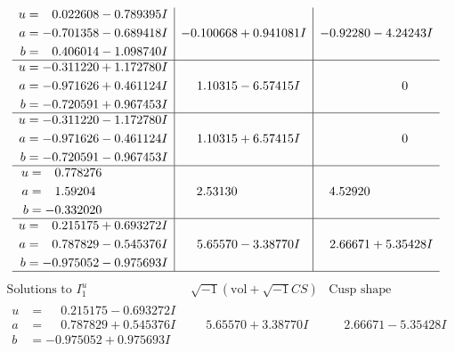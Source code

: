 \documentclass[1p]{elsarticle_modified}
\theoremstyle{definition}
\newcommand{\I}{\sqrt{-1}}
\begin{document}
$$\begin{array}{c|c|c}
\begin{aligned}
u &= \phantom{-}0.022608 - 0.789395 I \\
a &= -0.701358 - 0.689418 I \\
b &= \phantom{-}0.406014 - 1.098740 I\end{aligned}
 & -0.100668 + 0.941081 I & -0.92280 - 4.24243 I \\ \hline\begin{aligned}
u &= -0.311220 + 1.172780 I \\
a &= -0.971626 + 0.461124 I \\
b &= -0.720591 + 0.967453 I\end{aligned}
 & \phantom{-}1.10315 - 6.57415 I & \phantom{-0.000000 } 0 \\ \hline\begin{aligned}
u &= -0.311220 - 1.172780 I \\
a &= -0.971626 - 0.461124 I \\
b &= -0.720591 - 0.967453 I\end{aligned}
 & \phantom{-}1.10315 + 6.57415 I & \phantom{-0.000000 } 0 \\ \hline\begin{aligned}
u &= \phantom{-}0.778276\phantom{ +0.000000I} \\
a &= \phantom{-}1.59204\phantom{ +0.000000I} \\
b &= -0.332020\phantom{ +0.000000I}\end{aligned}
 & \phantom{-}2.53130\phantom{ +0.000000I} & \phantom{-}4.52920\phantom{ +0.000000I} \\ \hline\begin{aligned}
u &= \phantom{-}0.215175 + 0.693272 I \\
a &= \phantom{-}0.787829 - 0.545376 I \\
b &= -0.975052 - 0.975693 I\end{aligned}
 & \phantom{-}5.65570 - 3.38770 I & \phantom{-}2.66671 + 5.35428 I\\
 \hline 
 \end{array}$$\newpage$$\begin{array}{c|c|c}  
\text{Solutions to }I^u_{1}& \I (\text{vol} + \sqrt{-1}CS) & \text{Cusp shape}\\
 \hline 
\begin{aligned}
u &= \phantom{-}0.215175 - 0.693272 I \\
a &= \phantom{-}0.787829 + 0.545376 I \\
b &= -0.975052 + 0.975693 I\end{aligned}
 & \phantom{-}5.65570 + 3.38770 I & \phantom{-}2.66671 - 5.35428 I \\ \hline\begin{aligned}

\end{aligned}
\end{array}$$
\end{document}
